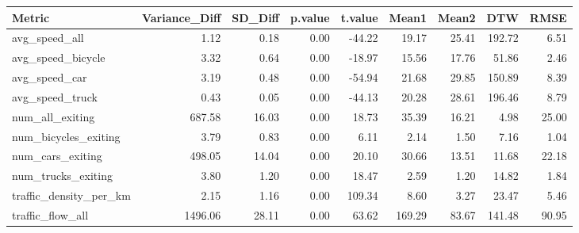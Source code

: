 \begin{table}[ht]
\centering
\begin{tabular}{lrrrrrrrr}
  \hline
Metric & Variance\_Diff & SD\_Diff & p.value & t.value & Mean1 & Mean2 & DTW & RMSE \\ 
  \hline
avg\_speed\_all & 1.12 & 0.18 & 0.00 & -44.22 & 19.17 & 25.41 & 192.72 & 6.51 \\ 
  avg\_speed\_bicycle & 3.32 & 0.64 & 0.00 & -18.97 & 15.56 & 17.76 & 51.86 & 2.46 \\ 
  avg\_speed\_car & 3.19 & 0.48 & 0.00 & -54.94 & 21.68 & 29.85 & 150.89 & 8.39 \\ 
  avg\_speed\_truck & 0.43 & 0.05 & 0.00 & -44.13 & 20.28 & 28.61 & 196.46 & 8.79 \\ 
  num\_all\_exiting & 687.58 & 16.03 & 0.00 & 18.73 & 35.39 & 16.21 & 4.98 & 25.00 \\ 
  num\_bicycles\_exiting & 3.79 & 0.83 & 0.00 & 6.11 & 2.14 & 1.50 & 7.16 & 1.04 \\ 
  num\_cars\_exiting & 498.05 & 14.04 & 0.00 & 20.10 & 30.66 & 13.51 & 11.68 & 22.18 \\ 
  num\_trucks\_exiting & 3.80 & 1.20 & 0.00 & 18.47 & 2.59 & 1.20 & 14.82 & 1.84 \\ 
  traffic\_density\_per\_km & 2.15 & 1.16 & 0.00 & 109.34 & 8.60 & 3.27 & 23.47 & 5.46 \\ 
  traffic\_flow\_all & 1496.06 & 28.11 & 0.00 & 63.62 & 169.29 & 83.67 & 141.48 & 90.95 \\ 
   \hline
\end{tabular}
\end{table}
